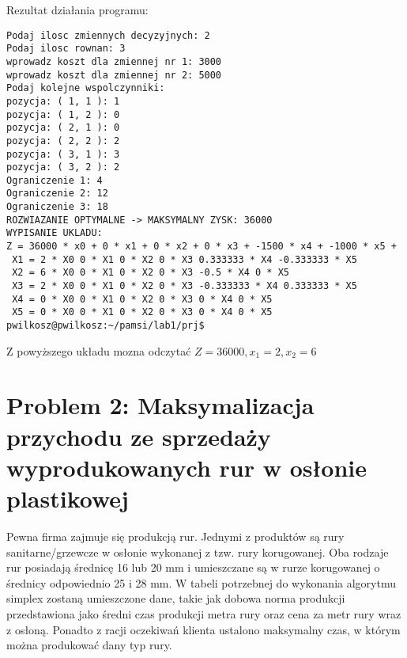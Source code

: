 \documentclass[a4paper,11pt]{article}
\begin{document}
Rezultat działania programu:
\tiny
\begin{verbatim}
Podaj ilosc zmiennych decyzyjnych: 2
Podaj ilosc rownan: 3
wprowadz koszt dla zmiennej nr 1: 3000
wprowadz koszt dla zmiennej nr 2: 5000
Podaj kolejne wspolczynniki: 
pozycja: ( 1, 1 ): 1
pozycja: ( 1, 2 ): 0
pozycja: ( 2, 1 ): 0
pozycja: ( 2, 2 ): 2
pozycja: ( 3, 1 ): 3
pozycja: ( 3, 2 ): 2
Ograniczenie 1: 4
Ograniczenie 2: 12
Ograniczenie 3: 18
ROZWIAZANIE OPTYMALNE -> MAKSYMALNY ZYSK: 36000
WYPISANIE UKLADU: 
Z = 36000 * x0 + 0 * x1 + 0 * x2 + 0 * x3 + -1500 * x4 + -1000 * x5 + 
 X1 = 2 * X0 0 * X1 0 * X2 0 * X3 0.333333 * X4 -0.333333 * X5 
 X2 = 6 * X0 0 * X1 0 * X2 0 * X3 -0.5 * X4 0 * X5 
 X3 = 2 * X0 0 * X1 0 * X2 0 * X3 -0.333333 * X4 0.333333 * X5 
 X4 = 0 * X0 0 * X1 0 * X2 0 * X3 0 * X4 0 * X5 
 X5 = 0 * X0 0 * X1 0 * X2 0 * X3 0 * X4 0 * X5 
pwilkosz@pwilkosz:~/pamsi/lab1/prj$ 

\end{verbatim}
\normalsize
Z powyższego układu mozna odczytać $Z = 36000, x_{1} = 2, x_{2} = 6 $

\section{Problem 2: Maksymalizacja przychodu ze sprzedaży wyprodukowanych rur w osłonie plastikowej}
Pewna firma zajmuje się produkcją rur. Jednymi z produktów są rury sanitarne/grzewcze w osłonie wykonanej z tzw. rury korugowanej. Oba rodzaje rur
posiadają średnicę 16 lub 20 mm i umieszczane są w rurze korugowanej o średnicy odpowiednio 25 i 28 mm. W tabeli potrzebnej do wykonania algorytmu simplex
zostaną umieszczone dane, takie jak dobowa norma produkcji przedstawiona jako średni czas produkcji metra rury oraz cena za metr rury wraz z osłoną. Ponadto
z racji oczekiwań klienta ustalono maksymalny czas, w którym można produkować dany typ rury.
\end{document}
